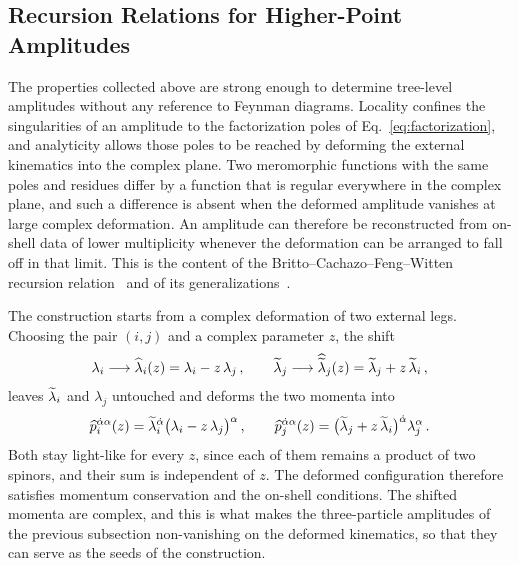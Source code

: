\subsection{Recursion Relations for Higher-Point Amplitudes\label{sec:BCFW}}

The properties collected above are strong enough to determine tree-level amplitudes without any
reference to Feynman diagrams. Locality confines the singularities of an amplitude to the
factorization poles of Eq.~\eqref{eq:factorization}, and analyticity allows those poles to be
reached by deforming the external kinematics into the complex plane. Two meromorphic functions with the same poles and residues differ by a function that is regular
everywhere in the complex plane, and such a difference is absent when the deformed amplitude
vanishes at large complex deformation. An amplitude can therefore be reconstructed from on-shell
data of lower multiplicity whenever the deformation can be arranged to fall off in that limit. This is the content of the Britto--Cachazo--Feng--Witten recursion
relation~\cite{Britto:2004ap,Britto:2005fq} and of its generalizations~\cite{Risager:2005vk,Cohen:2010mi,Kampf:2012fn,Cheung:2014dqa,Cheung:2015ota,Cheung:2015cba}.

The construction starts from a complex deformation of two external legs. Choosing the pair $(i,j)$
and a complex parameter $z$, the shift
\begin{equation}\label{eq:BCFWshift}
    \lambda_i \longrightarrow \widehat\lambda_i(z) = \lambda_i - z\,\lambda_j\,, \qquad
    \widetilde{\lambda}_j \longrightarrow \widehat{\widetilde{\lambda}}_j(z) = \widetilde{\lambda}_j + z\,\widetilde{\lambda}_i\,,
\end{equation}
leaves $\widetilde{\lambda}_i$ and $\lambda_j$ untouched and deforms the two momenta into
\begin{equation}
    \widehat p_i^{\dot\alpha\alpha}(z) = \widetilde{\lambda}_i^{\dot\alpha}\big(\lambda_i - z\,\lambda_j\big)^{\alpha}\,,
    \qquad
    \widehat p_j^{\dot\alpha\alpha}(z) = \big(\widetilde{\lambda}_j + z\,\widetilde{\lambda}_i\big)^{\dot\alpha}\lambda_j^{\alpha}\,.
\end{equation}
Both stay light-like for every $z$, since each of them remains a product of two spinors, and their sum is independent of $z$. The deformed configuration therefore satisfies momentum conservation and the
on-shell conditions. The shifted momenta are complex, and this is what makes the three-particle
amplitudes of the previous subsection non-vanishing on the deformed kinematics, so that they can
serve as the seeds of the construction.

